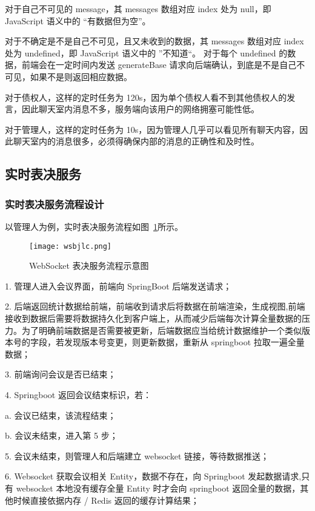 对于自己不可见的 message，其 messages 数组对应 index 处为 null，即 JavaScript 语义中的 “有数据但为空”。

对于不确定是不是自己不可见，且又未收到的数据，其 messages 数组对应 index 处为 undefined，即 JavaScript 语义中的 ”不知道“。
对于每个 undefined 的数据，前端会在一定时间内发送 generateBase 请求向后端确认，到底是不是自己不可见，如果不是则返回相应数据。

对于债权人，这样的定时任务为 120s，因为单个债权人看不到其他债权人的发言，因此聊天室内消息不多，服务端向该用户的网络拥塞可能性低。

对于管理人，这样的定时任务为 10s，因为管理人几乎可以看见所有聊天内容，因此聊天室内的消息很多，必须得确保内部的消息的正确性和及时性。

\subsection{实时表决服务}

\subsubsection{实时表决服务流程设计}
以管理人为例，实时表决服务流程如图~\ref{fig:wsbjlc}所示。

\begin{figure}[!htp]
    \centering
    \texttt{[image: wsbjlc.png]}
    \caption{WebSocket 表决服务流程示意图}
    \label{fig:wsbjlc}
  \end{figure}

  \quad{}1. 管理人进入会议界面，前端向 SpringBoot 后端发送请求；

  \quad{}2. 后端返回统计数据给前端，前端收到请求后将数据在前端渲染，生成视图,前端接收到数据后需要将数据持久化到客户端上，从而减少后端每次计算全量数据的压力。为了明确前端数据是否需要被更新，后端数据应当给统计数据维护一个类似版本号的字段，若发现版本号变更，则更新数据，重新从 springboot 拉取一遍全量数据；

  \quad{}3. 前端询问会议是否已结束；

  \quad{}4. Springboot 返回会议结束标识，若：

  \quad{}\quad{}a. 会议已结束，该流程结束；
  
  \quad{}\quad{}b. 会议未结束，进入第 5 步；
  
  \quad{}5. 会议未结束，则管理人和后端建立 websocket 链接，等待数据推送；
  
  \quad{}6. Websocket 获取会议相关 Entity，数据不存在，向 Springboot 发起数据请求,只有 websocket 本地没有缓存全量 Entity 时才会向 springboot 返回全量的数据，其他时候直接依据内存 / Redis 返回的缓存计算结果；
  
